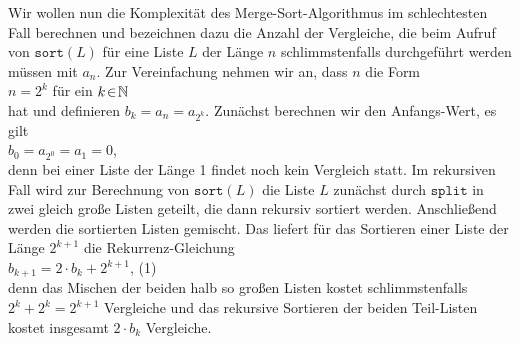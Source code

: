 \noindent
Wir wollen nun die Komplexit\"at des Merge-Sort-Algorithmus im schlechtesten Fall berechnen und bezeichnen 
dazu die Anzahl der Vergleiche, die beim Aufruf von
$\mathtt{sort}(L)$ f\"ur eine Liste $L$ der L\"ange $n$
schlimmstenfalls durchgef\"uhrt werden m\"ussen mit $a_n$.  
Zur Vereinfachung nehmen wir an, dass $n$ die Form \\[0.2cm]
\hspace*{1.3cm} $\displaystyle n = 2^k$ \qquad f\"ur ein $k \!\in\! \mathbb{N}$ \\[0.2cm]
hat und definieren $b_k = a_n = a_{2^k}$.  Zun\"achst berechnen wir den Anfangs-Wert, es gilt
\\[0.2cm]
\hspace*{1.3cm}
$\displaystyle b_0 = a_{2^0} = a_1 = 0$, 
\\[0.2cm]
denn bei einer Liste der L\"ange 1 findet noch kein Vergleich statt.
Im rekursiven Fall wird zur Berechnung
von $\mathtt{sort}(L)$ die Liste $L$ zun\"achst durch $\texttt{split}$ in zwei
gleich gro{\ss}e Listen geteilt, die dann rekursiv sortiert werden. Anschlie{\ss}end
werden die sortierten Listen
gemischt.  Das liefert f\"ur das Sortieren einer Liste der L\"ange $2^{k+1}$ die Rekurrenz-Gleichung \\[0.2cm]
\hspace*{1.3cm} $b_{k+1} = 2 \cdot b_k + 2^{k+1}$, \hspace*{\fill} (1) \\[0.2cm]
denn das Mischen der beiden halb so gro{\ss}en Listen kostet schlimmstenfalls $2^k +
2^k = 2^{k+1}$ Vergleiche 
und das rekursive Sortieren der beiden Teil-Listen
kostet insgesamt $2 \cdot b_k$ Vergleiche.


